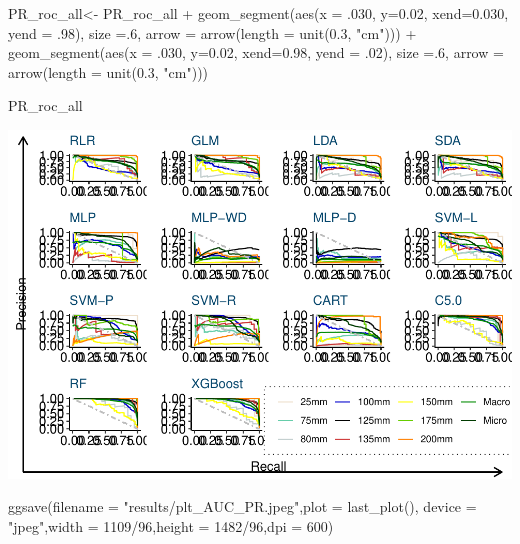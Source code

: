 \documentclass[
]{article}
\newenvironment{Shaded}{\begin{snugshade}}{\end{snugshade}}
\newcommand{\AttributeTok}[1]{\textcolor[rgb]{0.77,0.63,0.00}{#1}}
\newcommand{\DecValTok}[1]{\textcolor[rgb]{0.00,0.00,0.81}{#1}}
\newcommand{\FloatTok}[1]{\textcolor[rgb]{0.00,0.00,0.81}{#1}}
\newcommand{\FunctionTok}[1]{\textcolor[rgb]{0.00,0.00,0.00}{#1}}
\newcommand{\NormalTok}[1]{#1}
\newcommand{\OtherTok}[1]{\textcolor[rgb]{0.56,0.35,0.01}{#1}}
\newcommand{\SpecialCharTok}[1]{\textcolor[rgb]{0.00,0.00,0.00}{#1}}
\newcommand{\StringTok}[1]{\textcolor[rgb]{0.31,0.60,0.02}{#1}}
\begin{document}
\begin{Shaded}
\begin{Highlighting}[]
\NormalTok{PR\_roc\_all}\OtherTok{\textless{}{-}}\NormalTok{ PR\_roc\_all }\SpecialCharTok{+}
  \FunctionTok{geom\_segment}\NormalTok{(}\FunctionTok{aes}\NormalTok{(}\AttributeTok{x =}\NormalTok{ .}\DecValTok{030}\NormalTok{, }\AttributeTok{y=}\FloatTok{0.02}\NormalTok{, }\AttributeTok{xend=}\FloatTok{0.030}\NormalTok{, }\AttributeTok{yend =}\NormalTok{ .}\DecValTok{98}\NormalTok{), }\AttributeTok{size =}\NormalTok{.}\DecValTok{6}\NormalTok{,}
               \AttributeTok{arrow =} \FunctionTok{arrow}\NormalTok{(}\AttributeTok{length =} \FunctionTok{unit}\NormalTok{(}\FloatTok{0.3}\NormalTok{, }\StringTok{"cm"}\NormalTok{))) }\SpecialCharTok{+}
  \FunctionTok{geom\_segment}\NormalTok{(}\FunctionTok{aes}\NormalTok{(}\AttributeTok{x =}\NormalTok{ .}\DecValTok{030}\NormalTok{, }\AttributeTok{y=}\FloatTok{0.02}\NormalTok{, }\AttributeTok{xend=}\FloatTok{0.98}\NormalTok{, }\AttributeTok{yend =}\NormalTok{ .}\DecValTok{02}\NormalTok{), }\AttributeTok{size =}\NormalTok{.}\DecValTok{6}\NormalTok{,}
               \AttributeTok{arrow =} \FunctionTok{arrow}\NormalTok{(}\AttributeTok{length =} \FunctionTok{unit}\NormalTok{(}\FloatTok{0.3}\NormalTok{, }\StringTok{"cm"}\NormalTok{)))}

\NormalTok{PR\_roc\_all}
\end{Highlighting}
\end{Shaded}

\includegraphics{sl-inf-cairs-2301_files/figure-latex/PRplots-1.pdf}

\begin{Shaded}
\begin{Highlighting}[]
\FunctionTok{ggsave}\NormalTok{(}\AttributeTok{filename =} \StringTok{"results/plt\_AUC\_PR.jpeg"}\NormalTok{,}\AttributeTok{plot =} \FunctionTok{last\_plot}\NormalTok{(),}
       \AttributeTok{device =} \StringTok{"jpeg"}\NormalTok{,}\AttributeTok{width =} \DecValTok{1109}\SpecialCharTok{/}\DecValTok{96}\NormalTok{,}\AttributeTok{height =} \DecValTok{1482}\SpecialCharTok{/}\DecValTok{96}\NormalTok{,}\AttributeTok{dpi =} \DecValTok{600}\NormalTok{)}
\end{Highlighting}
\end{Shaded}
\end{document}
